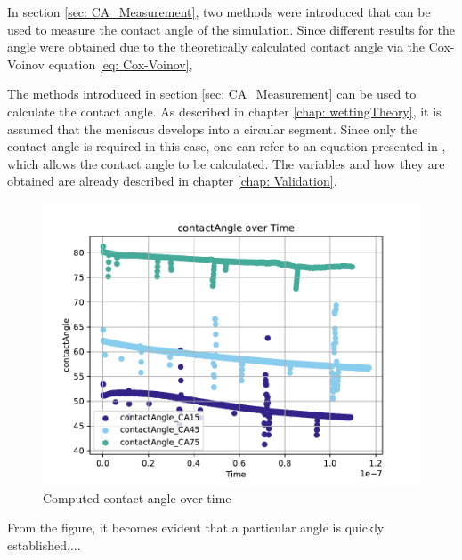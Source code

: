 In section \ref{sec: CA_Measurement}, two methods were introduced that can be used to measure the contact angle of the simulation. Since different results for the angle were obtained due to the theoretically calculated contact angle via the Cox-Voinov equation \ref*{eq: Cox-Voinov},

The methods introduced in section \ref*{sec: CA_Measurement} can be used to calculate the contact angle. As described in chapter \ref*{chap: wettingTheory}, it is assumed that the meniscus develops into a circular segment. Since only the contact angle is required in this case, one can refer to an equation presented in \cite{buttPhysicsChemistryInterfaces}, which allows the contact angle to be calculated. The variables and how they are obtained are already described in chapter \ref*{chap: Validation}. 
\begin{figure}[h]
    \centering
    \includegraphics[width=.95\textwidth]{Pictures/contactAngle_overTime.pdf}
    \caption{Computed contact angle over time}
    \label{fig: CA_overTime}
\end{figure}
From the figure, it becomes evident that a particular angle is quickly established,... 


